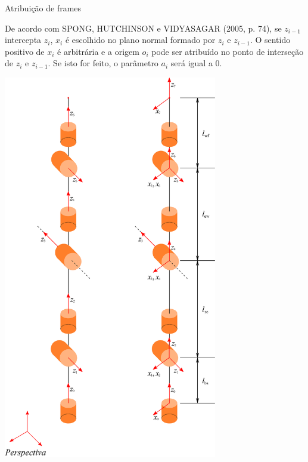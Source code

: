 \documentclass[aspectratio=169]{beamer}
\begin{document}
\begin{frame}{Atribuição de frames}
\begin{minipage}{0.58\textwidth}
    De acordo com SPONG, HUTCHINSON e VIDYASAGAR (2005, p. 74), se $z_{i-1}$ \alert{intercepta} $z_i$, $x_i$ é escolhido no plano normal formado por $z_i$ e $z_{i-1}$. O sentido positivo de $x_i$ é arbitrária e a origem $o_i$ pode ser atribuído no ponto de interseção de $z_i$ e $z_{i-1}$. Se isto for feito, o parâmetro $a_i$ será igual a 0.
\end{minipage}\hfill
\begin{minipage}{0.38\textwidth}
    \includegraphics[width=0.7\textwidth]{Fig/x.eps}
\end{minipage}
\end{frame}
\end{document}
